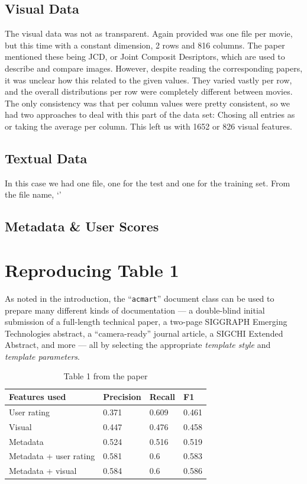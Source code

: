 \documentclass[sigconf]{acmart}
\begin{document}
\subsection{Visual Data}
The visual data was not as transparent. Again provided was one file per movie, but this time with a constant dimension, 2 rows and 816 columns. The paper mentioned these being JCD, or Joint Composit Desriptors, which are used to describe and compare images. However, despite reading the corresponding papers, it was unclear how this related to the given values. They varied vastly per row, and the overall distributions per row were completely different between movies. The only consistency was that per column values were pretty consistent, so we had two approaches to deal with this part of the data set: Chosing all entries as or taking the average per column. This left us with 1652 or 826 visual features.  

\subsection{Textual Data}
In this case we had one file, one for the test and one for the training set. From the file name, \lq \rq

\subsection{Metadata \& User Scores}

\section{Reproducing Table 1}
As noted in the introduction, the ``\verb|acmart|'' document class can
be used to prepare many different kinds of documentation --- a
double-blind initial submission of a full-length technical paper, a
two-page SIGGRAPH Emerging Technologies abstract, a ``camera-ready''
journal article, a SIGCHI Extended Abstract, and more --- all by
selecting the appropriate {\itshape template style} and {\itshape
  template parameters}.

\begin{table}[]
  \caption*{Table 1 from the paper}
\begin{tabular}{llll}
\hline
Features used          & Precision & Recall & F1    \\ \hline
User rating            & 0.371     & 0.609  & 0.461 \\
Visual                 & 0.447     & 0.476  & 0.458 \\
Metadata               & 0.524     & 0.516  & 0.519 \\
Metadata + user rating & 0.581     & 0.6    & 0.583 \\
Metadata + visual      & 0.584     & 0.6    & 0.586 \\ \hline
\end{tabular}
\end{table}
\end{document}

